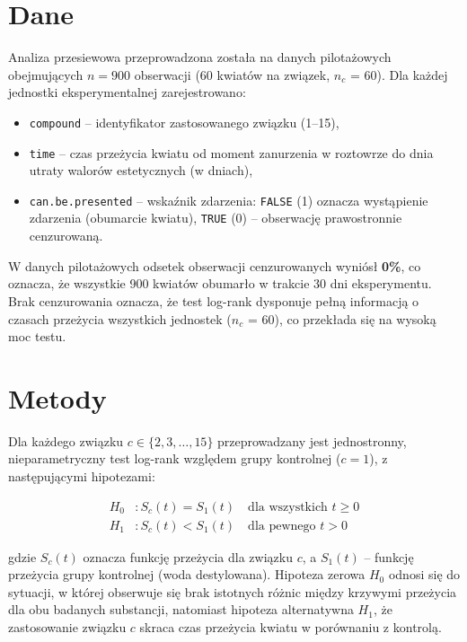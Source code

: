 \documentclass[12pt, a4paper]{article}
\begin{document}
\section{Dane}

Analiza przesiewowa przeprowadzona została na danych pilotażowych obejmujących
$n = 900$ obserwacji (60 kwiatów na związek, $n_c$ = 60). Dla każdej jednostki eksperymentalnej zarejestrowano:

\begin{itemize}[noitemsep]
    \item \texttt{compound} -- identyfikator zastosowanego związku (1--15),
    \item \texttt{time} -- czas przeżycia kwiatu od moment zanurzenia w roztowrze do dnia utraty walorów estetycznych (w dniach),
    \item \texttt{can.be.presented} -- wskaźnik zdarzenia: \texttt{FALSE} (1) oznacza
          wystąpienie zdarzenia (obumarcie kwiatu), \texttt{TRUE} (0) -- obserwację prawostronnie cenzurowaną.
\end{itemize}

W danych pilotażowych odsetek obserwacji cenzurowanych wyniósł \textbf{0\%}, co oznacza, że wszystkie 900 kwiatów obumarło w trakcie 30 dni eksperymentu.
Brak cenzurowania oznacza, że test log-rank dysponuje pełną informacją o czasach
przeżycia wszystkich jednostek ($n_c$ = 60), co przekłada się na wysoką moc testu.

\section{Metody}\label{sec:metody}
Dla każdego związku $c \in \{2, 3, \ldots, 15\}$
przeprowadzany jest jednostronny, nieparametryczny test log-rank względem grupy kontrolnej ($c = 1$),
z następującymi hipotezami:

\begin{align*}
    H_0 &: S_c(t) = S_1(t) \quad \text{dla wszystkich } t \geq 0 \\
    H_1 &: S_c(t) < S_1(t) \quad \text{dla pewnego } t > 0
\end{align*}

gdzie $S_c(t)$ oznacza funkcję przeżycia dla związku $c$, a $S_1(t)$ -- funkcję przeżycia
grupy kontrolnej (woda destylowana). Hipoteza zerowa $H_0$ odnosi się do sytuacji, w której obserwuje się brak istotnych różnic między krzywymi przeżycia dla obu badanych substancji, natomiast hipoteza alternatywna $H_1$, że zastosowanie
związku $c$ skraca czas przeżycia kwiatu w porównaniu z kontrolą.
\end{document}
